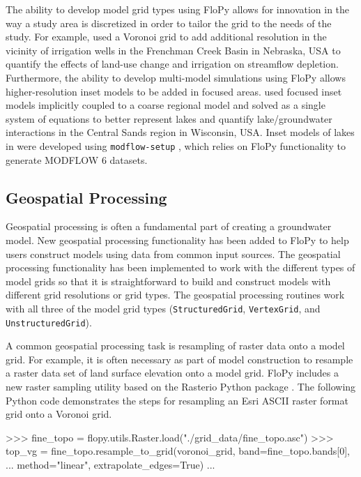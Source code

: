 \documentclass[11pt, oneside]{article}  	%
\begin{document}
The ability to develop model grid types using FloPy allows for innovation in the way a study area is discretized in order to tailor the grid to the needs of the study. For example, \cite{Moussa2018} used a Voronoi grid to add additional resolution in the vicinity of irrigation wells in the Frenchman Creek Basin in Nebraska, USA to quantify the effects of land-use change and irrigation on streamflow depletion. Furthermore, the ability to develop multi-model simulations using FloPy allows higher-resolution inset models to be added in focused areas. \cite{fienen2022simulation} used focused inset models implicitly coupled to a coarse regional model and solved as a single system of equations to better represent lakes and quantify lake/groundwater interactions in the Central Sands region in Wisconsin, USA. Inset models of lakes in \cite{fienen2022simulation} were developed using \texttt{modflow-setup} \citep{leaf2022modflow}, which relies on FloPy functionality to generate MODFLOW 6 datasets.

\subsection{Geospatial Processing}

Geospatial processing is often a fundamental part of creating a groundwater model. New geospatial processing functionality has been added to FloPy to help users construct models using data from common input sources. The geospatial processing functionality has been implemented to work with the different types of model grids so that it is straightforward to build and construct models with different grid resolutions or grid types. The geospatial processing routines work with all three of the model grid types (\texttt{StructuredGrid}, \texttt{VertexGrid}, and \texttt{UnstructuredGrid}). 

A common geospatial processing task is resampling of raster data onto a model grid. For example, it is often necessary as part of model construction to resample a raster data set of land surface elevation onto a model grid. FloPy includes a new raster sampling utility based on the Rasterio Python package \citep{gillies_2019}. The following Python code demonstrates the steps for resampling an Esri ASCII raster format grid onto a Voronoi grid.

\begin{python}
>>> fine_topo = flopy.utils.Raster.load("./grid_data/fine_topo.asc")
>>> top_vg = fine_topo.resample_to_grid(voronoi_grid, band=fine_topo.bands[0],
... method="linear", extrapolate_edges=True)
...
\end{python}
\end{document}

